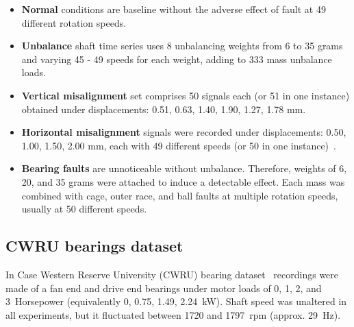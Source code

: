 \begin{itemize}
\itemsep0pt

\item \textbf{Normal} conditions are baseline without the adverse effect of fault at 49 different rotation speeds. 

\item \textbf{Unbalance} shaft time series uses 8 unbalancing weights from 6 to 35 grams and varying 45 - 49 speeds for each weight, adding to 333 mass unbalance loads. 

\item \textbf{Vertical misalignment} set comprises 50 signals each (or 51 in one instance) obtained under displacements: 0.51, 0.63, 1.40, 1.90, 1.27, 1.78 mm.

\item \textbf{Horizontal misalignment} signals were recorded under displacements: 0.50, 1.00, 1.50, 2.00 mm, each with 49 different speeds (or 50 in one instance)~\cite{pestana-viana_influence_2016}.

\item \textbf{Bearing faults} are unnoticeable without unbalance. Therefore, weights of 6, 20, and 35 grams were attached to induce a detectable effect. Each mass was combined with cage, outer race, and ball faults at multiple rotation speeds, usually at 50 different speeds.
\end{itemize}


\subsection{CWRU bearings dataset}
In Case Western Reserve University (CWRU) bearing dataset~\cite{cwru_dataset} recordings were made of a fan end and drive end bearings under motor loads of 0, 1, 2, and 3~Horsepower (equivalently 0, 0.75, 1.49, 2.24~kW). Shaft speed was unaltered in all experiments, but it fluctuated between 1720 and 1797~rpm (approx. 29~Hz).

